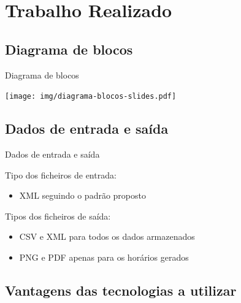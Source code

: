 \documentclass[aspectratio=169]{beamer}
\begin{document}
    \section{Trabalho Realizado}

    \subsection{Diagrama de blocos}

    \begin{frame}{Diagrama de blocos}
        \begin{center}
            \texttt{[image: img/diagrama-blocos-slides.pdf]}
        \end{center}
    \end{frame}

    \subsection{Dados de entrada e saída}

    \begin{frame}{Dados de entrada e saída}
        \justifying

        Tipo dos ficheiros de entrada:
        \begin{itemize}
            \item XML seguindo o padrão proposto
        \end{itemize}

        \vfill

        Tipos dos ficheiros de saída:
        \begin{itemize}
            \item CSV e XML para todos os dados armazenados
            \item PNG e PDF apenas para os horários gerados
        \end{itemize}
    \end{frame}

    \subsection{Vantagens das tecnologias a utilizar}
\end{document}
